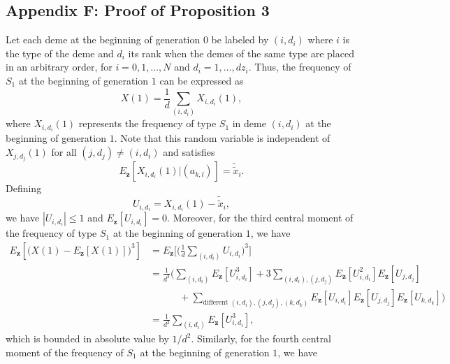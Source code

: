 \documentclass[11pt]{article}
\begin{document}
\subsection*{Appendix F: Proof of Proposition 3 }

Let each deme at the beginning of generation $0$ be labeled by $(i, d_i)$ where $i$ is the type of the deme and $d_i$ its rank when the demes of the same type are placed in an arbitrary order, for $i=0, 1, \ldots, N$ and $d_i=1, \ldots, dz_i$. Thus, the frequency of $S_1$ at the beginning of generation $1$ can be expressed as
\begin{equation}\label{sec2-eq31}
X(1)=\frac{1}{d}\sum_{(i, d_i)}^{}X_{i,d_i}(1),
\end{equation}
where $X_{i,d_i}(1)$ represents the frequency of type $S_1$ in deme $(i,d_i)$ at the beginning of generation $1$. Note that this random variable is independent of  $X_{j,d_j}(1)$ for all $(j, d_j) \ne (i, d_i)$ and satisfies
\begin{equation}\label{sec2-eq32}
E_{\mathbf{z}}\left[X_{i,d_i}(1)\Big|(a_{k,l})_{}\right]=\tilde{\tilde{x}}_{i}.
\end{equation}
Defining
\begin{equation}\label{sec2-eq33}
U_{i,d_i}=X_{i,d_i}(1)-\tilde{\tilde{x}}_{i},
\end{equation}
 we have $\left|U_{i,d_i}\right|\leq1$ and 
$E_{\mathbf{z}}\left[U_{i,d_i}\right]=0$.
Moreover, for the third central moment of the  frequency of type $S_1$ at the beginning of generation $1$, we have
\begin{align}\label{sec2-eq34}
E_{\mathbf{z}}\left[\Big(X(1)-E_{\mathbf{z}}\left[X(1)\right]\Big)^3\right]&=E_{\mathbf{z}}\Bigg[\Bigg(\frac{1}{d}\sum_{(i,d_i)}U_{i,d_i}\Bigg)^3\Bigg]\nonumber\\
&=\frac{1}{d^3}\Bigg(\sum_{(i,d_i)}E_{\mathbf{z}}\left[U_{i,d_i}^3\right]
+3\sum_{(i,d_i), (j,d_j)}E_{\mathbf{z}}\left[U_{i,d_i}^2\right]E_{\mathbf{z}}\left[U_{j,d_{j}}\right]\nonumber\\
&\quad\quad\quad+\sum_{\textrm{different }(i,d_i), (j,d_j), (k,d_k)}E_{\mathbf{z}}\left[U_{i,d_i}\right]E_{\mathbf{z}}\left[U_{j,d_{j}}\right]E_{\mathbf{z}}\left[U_{k,d_{k}}\right]
\Bigg)\nonumber\\
&=\frac{1}{d^3}\sum_{(i,d_i)}E_{\mathbf{z}}\left[U_{i,d_i}^3\right],%
\end{align}
which is bounded in absolute value by $1/d^2$.
Similarly, for the fourth central moment of the frequency of $S_1$ at the beginning of generation $1$, we have
\end{document}
